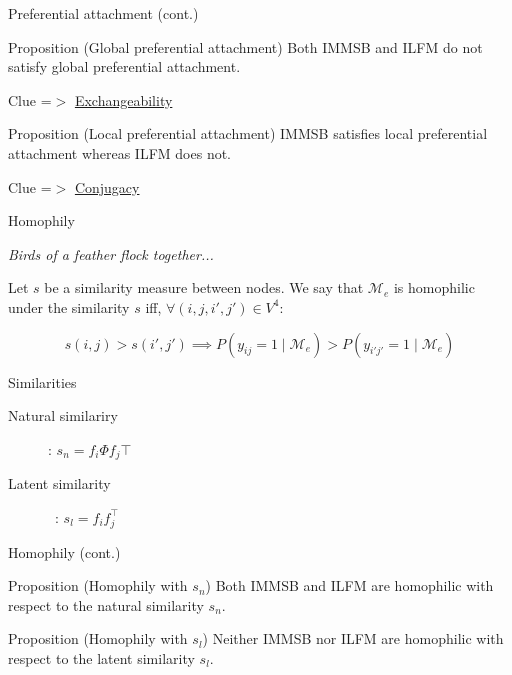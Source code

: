\begin{frame}[c]{Preferential attachment (cont.)}

\begin{block}{Proposition (Global preferential attachment)}
Both IMMSB and ILFM  do not satisfy global preferential attachment.
\end{block}
Clue =$>$ \underline{Exchangeability}

\vspace{1em}

\begin{block}{Proposition (Local preferential attachment)}
IMMSB satisfies local preferential attachment whereas ILFM does not.
\end{block}
Clue =$>$ \underline{Conjugacy}

\end{frame}


\begin{frame}[c]{Homophily}

\emph{Birds of a feather flock together...}
\vspace{2em}

\begin{definition}[Homophily]
Let $s$ be a similarity measure between nodes. 
We say that $\mathcal{M}_e$ is homophilic under the similarity $s$ iff, $\forall (i,j,i',j') \in V^4$:

\[ s(i,j) > s(i',j')  \implies P(y_{ij}=1 \mid \mathcal{M}_e) > P(y_{i'j'}=1  \mid \mathcal{M}_e) \]

\end{definition}

\begin{block}{Similarities}
    \begin{description}
    \item[Natural similariry] : $s_n = f_i \Phi f_j\top $
    \item[Latent similarity] \ : $s_l = f_i f_j^\top$
    \end{description} 
\end{block}

\end{frame}

\begin{frame}{Homophily (cont.)}

\begin{block}{Proposition (Homophily with $s_n$)}
Both IMMSB and ILFM are homophilic with respect to the natural similarity $s_n$.
\end{block}

\vspace{2em}

\begin{block}{Proposition (Homophily with $s_l$)}
Neither IMMSB nor ILFM are homophilic with respect to the latent similarity $s_l$.
\end{block}

\end{frame}



